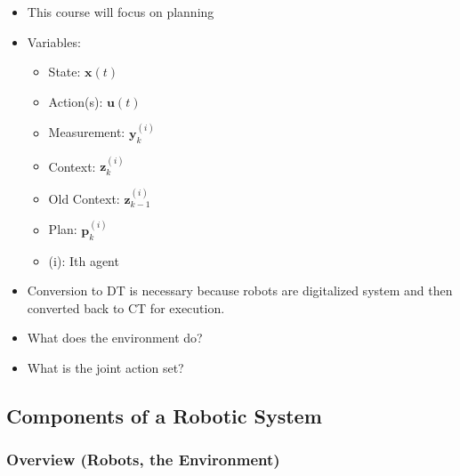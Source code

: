 \begin{summary}
    \begin{itemize}
        \item This course will focus on planning
        \item Variables:
        \begin{itemize}
            \item State: $\mathbf{x}(t)$
            \item Action(s): $\mathbf{u}(t)$
            \item Measurement: $\mathbf{y}_k^{(i)}$
            \item Context: $\mathbf{z}_k^{(i)}$
            \item Old Context: $\mathbf{z}_{k-1}^{(i)}$
            \item Plan: $\mathbf{p}_k^{(i)}$
            \item (i): Ith agent
        \end{itemize}
        \item Conversion to DT is necessary because robots are digitalized system and then converted back to CT for execution.
    \end{itemize}
\end{summary}
    

\begin{faq}
    \begin{itemize}
        \item What does the environment do?
        \item What is the joint action set?
    \end{itemize}
\end{faq}

\subsection{Components of a Robotic System}
\begin{summary}
\end{summary}

\subsubsection{Overview (Robots, the Environment)}
\begin{definition}
\end{definition}

